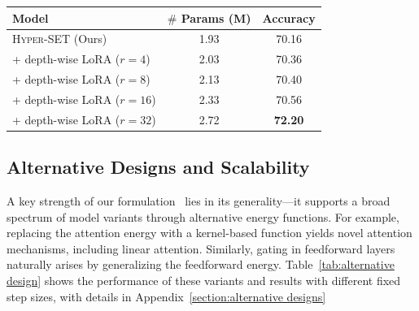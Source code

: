 \begin{table}[htbp]
\begin{minipage}[t]{0.46\textwidth}
{\begin{tabular}{lcc}
            \toprule
            \textbf{Model}  & \textbf{$\#$ Params (M)} & \textbf{Accuracy}\\
            \midrule
            \textsc{Hyper-SET} (Ours) & 1.93  & 70.16 \\
            + depth-wise LoRA ($r=4$) & 2.03 & 70.36\\
            + depth-wise LoRA ($r=8$) & 2.13 & 70.40\\
            + depth-wise LoRA ($r=16$) & 2.33 & 70.56\\
            + depth-wise LoRA ($r=32$) & 2.72 & \textbf{72.20}\\
            \bottomrule
        \end{tabular}
        }
    \end{minipage}
\end{table}

\subsection{Alternative Designs and Scalability}

A key strength of our formulation~ lies in its generality—it supports a broad spectrum of model variants through alternative energy functions. For example, replacing the attention energy with a kernel-based function yields novel attention mechanisms, including linear attention. Similarly, gating in feedforward layers naturally arises by generalizing the feedforward energy. Table~\ref{tab:alternative design} shows the performance of these variants and results with different fixed step sizes, with details in Appendix~\ref{section:alternative designs}

